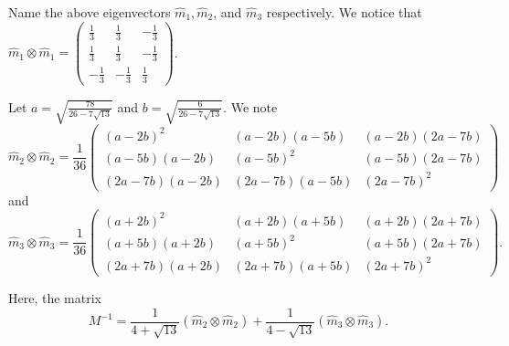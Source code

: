 \documentclass[a4paper, 12pt,oneside,openany]{book}
\begin{document}
{	Name the above eigenvectors $\hat{m}_1, \hat{m}_2$, and $\hat{m}_3$ respectively. We notice that $\hat{m}_1 \otimes \hat{m}_1 = \begin{pmatrix} \frac{1}{3} & \frac{1}{3} & -\frac{1}{3} \\ \frac{1}{3} & \frac{1}{3} & -\frac{1}{3} \\  -\frac{1}{3} & -\frac{1}{3} & \frac{1}{3} \end{pmatrix}$.
	
	Let $a =  \sqrt{\frac{78}{26-7\sqrt{13}}}$ and $b= \sqrt{\frac{6}{26-7\sqrt{13}}}$. We note $$\hat{m}_2 \otimes \hat{m}_2 = \frac{1}{36}\begin{pmatrix} (a-2b)^2 & (a-2b)(a-5b) & (a-2b)(2a-7b) \\ (a-5b)(a-2b) & (a-5b)^2 & (a-5b)(2a-7b) \\ (2a-7b)(a-2b) & (2a-7b)(a-5b) & (2a-7b)^2 \end{pmatrix}$$ and $$\hat{m}_3 \otimes \hat{m}_3 = \frac{1}{36}\begin{pmatrix} (a+2b)^2 & (a+2b)(a+5b) & (a+2b)(2a+7b) \\ (a+5b)(a+2b) & (a+5b)^2 & (a+5b)(2a+7b) \\ (2a+7b)(a+2b) & (2a+7b)(a+5b) & (2a+7b)^2 \end{pmatrix}.$$
	
	Here, the matrix $$M^{-1} = \frac{1}{4+\sqrt{13}} (\hat{m}_2 \otimes \hat{m}_2) + \frac{1}{4-\sqrt{13}}(\hat{m}_3 \otimes \hat{m}_3).$$
}
%	
\end{document}
